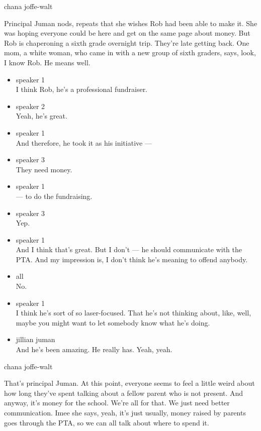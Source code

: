 chana joffe-walt

Principal Juman nods, repeats that she wishes Rob had been able to make
it. She was hoping everyone could be here and get on the same page about
money. But Rob is chaperoning a sixth grade overnight trip. They're late
getting back. One mom, a white woman, who came in with a new group of
sixth graders, says, look, I know Rob. He means well.

\begin{itemize}
\item
  speaker 1\\
  I think Rob, he's a professional fundraiser.
\item
  speaker 2\\
  Yeah, he's great.
\item
  speaker 1\\
  And therefore, he took it as his initiative ---
\item
  speaker 3\\
  They need money.
\item
  speaker 1\\
  --- to do the fundraising.
\item
  speaker 3\\
  Yep.
\item
  speaker 1\\
  And I think that's great. But I don't --- he should communicate with
  the PTA. And my impression is, I don't think he's meaning to offend
  anybody.
\item
  all\\
  No.
\item
  speaker 1\\
  I think he's sort of so laser-focused. That he's not thinking about,
  like, well, maybe you might want to let somebody know what he's doing.
\item
  jillian juman\\
  And he's been amazing. He really has. Yeah, yeah.
\end{itemize}

chana joffe-walt

That's principal Juman. At this point, everyone seems to feel a little
weird about how long they've spent talking about a fellow parent who is
not present. And anyway, it's money for the school. We're all for that.
We just need better communication. Imee she says, yeah, it's just
usually, money raised by parents goes through the PTA, so we can all
talk about where to spend it.

